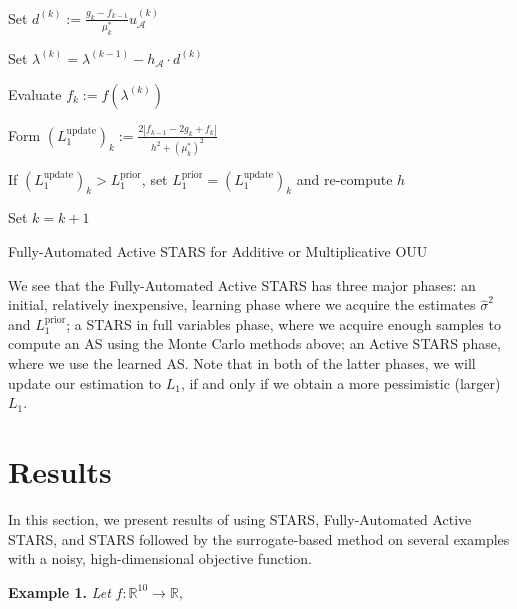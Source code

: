 \documentclass{amsart}
\newcommand{\A}{\mathcal{A}}
\newcommand{\R}{\mathbb{R}}
\begin{document}
\begin{algorithm}[H]
{  Set $ d^{(k)}:=\frac{g_k-f_{k-1}}{\mu^*_k}u_\A^{(k)}$\;
  
  Set $\lambda^{(k)}=\lambda^{(k-1)}-h_\A\cdot d^{(k)}$\;
  
  Evaluate $f_k:=f(\lambda^{(k)})$\;
  
    Form $(L_1^\text{update})_k:=\frac{2|f_{k-1}-2g_k +f_k|}{h^2+(\mu^*_k)^2}$\;
  
  If $(L_1^\text{update})_k>L_1^\text{prior}$, set $L_1^\text{prior}=(L_1^\text{update})_k$ and re-compute $h$\;
  
  Set $k=k+1$\;}


	\caption{Fully-Automated Active STARS for Additive or Multiplicative OUU}

\end{algorithm}

\vspace{.25cm}

We see that the Fully-Automated Active STARS has three major phases: an initial, relatively inexpensive, learning phase where we acquire the estimates $\hat{\sigma}^2$ and $L_1^\text{prior}$; a STARS in full variables phase, where we acquire enough samples to compute an AS using the Monte Carlo methods above; an Active STARS phase, where we use the learned AS. Note that in both of the latter phases, we will update our estimation to $L_1$, if and only if we obtain a more pessimistic (larger) $L_1$.



\section{Results} \label{s:Results}

In this section, we present results of using STARS, Fully-Automated Active STARS, and STARS followed by the surrogate-based method on several examples with a noisy, high-dimensional objective function.

\noindent \textbf{Example 1.} \textit{Let} $f: \R^{10} \to \R ,$ 
\end{document}
